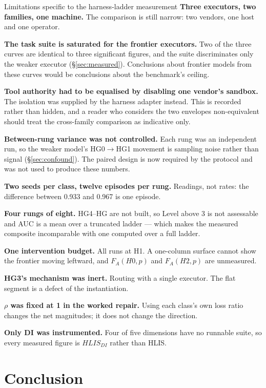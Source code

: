 \begin{cautionbox}{Limitations specific to the harness-ladder measurement}
\textbf{Three executors, two families, one machine.} The comparison is still narrow: two vendors, one host and one operator.

\textbf{The task suite is saturated for the frontier executors.} Two of the three curves are identical to three significant figures, and the suite discriminates only the weaker executor (\S\ref{sec:measured}). Conclusions about frontier models from these curves would be conclusions about the benchmark's ceiling.

\textbf{Tool authority had to be equalised by disabling one vendor's sandbox.} The isolation was supplied by the harness adapter instead. This is recorded rather than hidden, and a reader who considers the two envelopes non-equivalent should treat the cross-family comparison as indicative only.

\textbf{Between-rung variance was not controlled.} Each rung was an independent run, so the weaker model's HG0$\to$HG1 movement is sampling noise rather than signal (\S\ref{sec:confound}). The paired design is now required by the protocol and was not used to produce these numbers.

\textbf{Two seeds per class, twelve episodes per rung.} Readings, not rates: the difference between 0.933 and 0.967 is one episode.

\textbf{Four rungs of eight.} HG4--HG\Om{} are not built, so Level above 3 is not assessable and AUC is a mean over a truncated ladder --- which makes the measured composite incomparable with one computed over a full ladder.

\textbf{One intervention budget.} All runs at H1. A one-column surface cannot show the frontier moving leftward, and $F_A(H0,p)$ and $F_A(H2,p)$ are unmeasured.

\textbf{HG3's mechanism was inert.} Routing with a single executor. The flat segment is a defect of the instantiation.

\textbf{$\rho$ was fixed at 1 in the worked repair.} Using each class's own loss ratio changes the net magnitudes; it does not change the direction.

\textbf{Only DI was instrumented.} Four of five dimensions have no runnable suite, so every measured figure is $HLIS_{DI}$ rather than HLIS.
\end{cautionbox}

\section{Conclusion}

